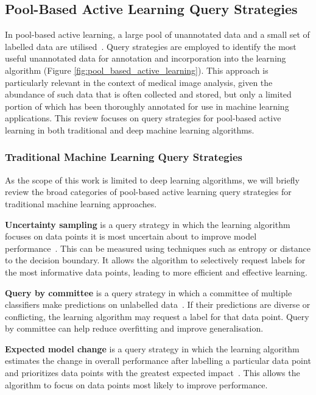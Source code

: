 \subsection{Pool-Based Active Learning Query Strategies}
\label{subsec:active_pool_based}
In pool-based active learning, a large pool of unannotated data and a small set of labelled data are utilised~\citep{settles2012active}. Query strategies are employed to identify the most useful unannotated data for annotation and incorporation into the learning algorithm (Figure \ref{fig:pool_based_active_learning}). This approach is particularly relevant in the context of medical image analysis, given the abundance of such data that is often collected and stored, but only a limited portion of which has been thoroughly annotated for use in machine learning applications. This review focuses on query strategies for pool-based active learning in both traditional and deep machine learning algorithms.

\subsubsection{Traditional Machine Learning Query Strategies}
As the scope of this work is limited to deep learning algorithms, we will briefly review the broad categories of pool-based active learning query strategies for traditional machine learning approaches.

\textbf{Uncertainty sampling} is a query strategy in which the learning algorithm focuses on data points it is most uncertain about to improve model performance~\citep{lewis1995sequential}. This can be measured using techniques such as entropy or distance to the decision boundary. It allows the algorithm to selectively request labels for the most informative data points, leading to more efficient and effective learning. 

\textbf{Query by committee} is a query strategy in which a committee of multiple classifiers make predictions on unlabelled data~\citep{seung1992query}. If their predictions are diverse or conflicting, the learning algorithm may request a label for that data point. Query by committee can help reduce overfitting and improve generalisation.

\textbf{Expected model change} is a query strategy in which the learning algorithm estimates the change in overall performance after labelling a particular data point and prioritizes data points with the greatest expected impact~\citep{settles2007multiple}. This allows the algorithm to focus on data points most likely to improve performance.


